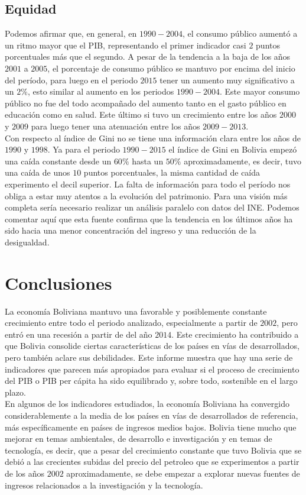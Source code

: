     \subsection{Equidad}
    Podemos afirmar que, en general, en $1990-2004$, el consumo público aumentó a un ritmo mayor que el PIB, representando el primer indicador casi $2$ puntos porcentuales más que el segundo. A pesar de la tendencia a la baja de los años $2001$ a $2005$, el porcentaje de consumo público se mantuvo por encima del inicio del período, para luego  en el periodo $2015$ tener un aumento muy significativo a un $2\%$, esto similar al aumento en los periodos $1990-2004$. Este mayor consumo público no fue del todo acompañado del aumento tanto en el gasto público en educación como en salud. Este último si tuvo un crecimiento entre los años $2000$ y $2009$ para luego tener una atenuación entre los años $2009-2013$.\\
    Con respecto al índice de Gini no se tiene una información clara entre los años de $1990$ y $1998$. Ya para el periodo $1990-2015$ el índice de Gini en Bolivia empezó una caída constante desde un $60\%$ hasta un $50\%$ aproximadamente, es decir, tuvo una caída de unos $10$ puntos porcentuales, la misma cantidad de caída experimento el decil superior. La falta de información para todo el período nos obliga a estar muy atentos a la evolución del patrimonio. Para una visión más completa sería necesario realizar un análisis paralelo con datos del INE. Podemos comentar aquí que esta fuente confirma que la tendencia en los últimos años ha sido hacia una menor concentración del ingreso y una reducción de la desigualdad.

    \section{Conclusiones}	
    La economía Boliviana mantuvo una favorable y posiblemente constante crecimiento entre todo el periodo analizado, especialmente a partir de $2002$, pero entró en una recesión a partir de  del año $2014$. Este crecimiento ha contribuido a que Bolivia consolide ciertas características de los países en vías de desarrollados, pero también aclare sus debilidades. Este informe muestra que hay una serie de indicadores que parecen más apropiados para evaluar si el proceso de crecimiento del PIB o PIB per cápita ha sido equilibrado y, sobre todo, sostenible en el largo plazo. \\
    En algunos de los indicadores estudiados, la economía Boliviana ha convergido considerablemente a la media de los países en vías de desarrollados de referencia, más específicamente en países de ingresos medios bajos. Bolivia tiene mucho que mejorar en temas ambientales, de desarrollo e investigación y en temas de tecnología, es decir, que a pesar del crecimiento constante que tuvo Bolivia que se debió a las crecientes subidas del precio del petroleo que se experimentos a partir de los años $2002$ aproximadamente, se debe empezar a explorar nuevas fuentes de ingresos relacionados a la investigación y la tecnología.


